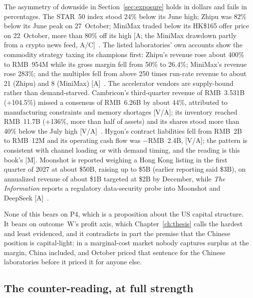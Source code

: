 The asymmetry of downside in Section~\ref{sec:exposure} holds in dollars and fails in percentages. The STAR~50 index stood 24\% below its June high; Zhipu was 82\% below its June peak on 27~October; MiniMax traded below its HK\$165 offer price on 22~October, more than 80\% off its high [A; the MiniMax drawdown partly from a crypto news feed, A/C]~\cite{cap-china-ai-equities,cap-minimax-ipo}. The listed laboratories' own accounts show the commodity strategy taxing its champions first: Zhipu's revenue rose about 400\% to RMB~954M while its gross margin fell from 50\% to 26.4\%; MiniMax's revenue rose 283\%; and the multiples fell from above 250 times run-rate revenue to about 21 (Zhipu) and 8 (MiniMax) [A]~\cite{cap-china-ai-equities}. The accelerator vendors are supply-bound rather than demand-starved. Cambricon's third-quarter revenue of RMB~3.531B ($+$104.5\%) missed a consensus of RMB~6.26B by about 44\%, attributed to manufacturing constraints and memory shortages [V/A]; its inventory reached RMB~11.7B ($+$136\%, more than half of assets) and its shares stood more than 40\% below the July high [V/A]~\cite{hw-cambricon-q3,cap-china-ai-equities}. Hygon's contract liabilities fell from RMB~2B to RMB~12M and its operating cash flow was $-$RMB~2.4B, [V/A]; the pattern is consistent with channel loading or with demand timing, and the reading is this book's [M]. Moonshot is reported weighing a Hong Kong listing in the first quarter of 2027 at about \$50B, raising up to \$5B (earlier reporting said \$3B), on annualized revenue of about \$1B targeted at \$2B by December, while \emph{The Information} reports a regulatory data-security probe into Moonshot and DeepSeek [A]~\cite{cap-moonshot-oct}.

None of this bears on P4, which is a proposition about the US capital structure. It bears on outcome~W's profit axis, which Chapter~\ref{ch:thesis} calls the hardest and least evidenced, and it contradicts in part the premise that the Chinese position is capital-light: in a marginal-cost market nobody captures surplus at the margin, China included, and October priced that sentence for the Chinese laboratories before it priced it for anyone else.

\subsection{The counter-reading, at full strength}
\label{sec:cap-oct-counter}

